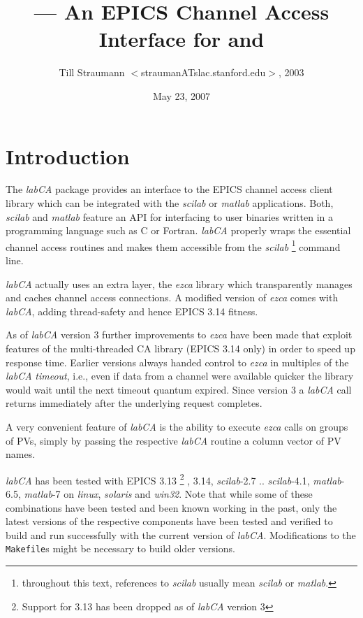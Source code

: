 \documentclass{article}
\title{\sca{} --- An EPICS Channel Access Interface for \scilab{} and \matlab{}}
\author{Till Straumann $<$straumanATslac.stanford.edu$>$, 2003}
\date{May 23, 2007}
\newcommand{\sca}{\ita{labCA}}
\newcommand{\scilab}{\ita{scilab}}
\newcommand{\matlab}{\ita{matlab}}
\newcommand{\windoze}{\ita{win32}}
\newcommand{\ezca}{\ita{ezca}}
\newcommand{\com}[1]{{\tt #1}}
\newcommand{\ita}[1]{\emph{#1}}
\begin{document}
\maketitle
{\hspace*{\fill}{\small\verb$Id: manual.tex,v 1.2 2007/11/16 16:45:00 ernesto Exp $}\hspace*{\fill}}
\section{Introduction}
The \sca{} package provides an interface to the
EPICS channel access client library which can be
integrated with the \scilab{} or \matlab{} applications.
Both, \scilab{} and \matlab{} feature an API for interfacing
to user binaries written in a programming language such
as C or Fortran. \sca{} properly wraps the essential
channel access routines and makes them accessible
from the \scilab%
\footnote{throughout this text, references to \scilab{}
usually mean \scilab{} or \matlab.}
command line.

\sca{} actually uses an extra layer, the \ezca{} library
which transparently manages and caches channel access 
connections. A modified version of \ezca{} comes with
\sca, adding thread-safety and hence EPICS 3.14 fitness.

As of \sca{} version 3 further improvements to \ezca{}
have been made that exploit features of the multi-threaded
CA library (EPICS 3.14 only) in order to speed up response time.
Earlier versions always handed control to \ezca{} in multiples of the
\sca{} \ita{timeout}, i.e., even if data from a channel
were available quicker the library would wait until the
next timeout quantum expired. Since version 3 a \sca{}
call returns immediately after the underlying request
completes.

A very convenient feature of \sca{} is the ability
to execute \ezca{} calls on groups of PVs, simply by
passing the respective \sca{} routine a column vector
of PV names.

\sca{} has been tested with EPICS 3.13%
\footnote{Support for 3.13 has been dropped as of \sca{} version 3}%
,
3.14, \scilab-2.7 .. \scilab-4.1,
\matlab-6.5, \matlab-7 on \ita{linux}, \ita{solaris} and
\windoze. Note that while some of these combinations have been
tested and been known working in the past, only the latest
versions of the respective components have been tested
and verified to build and run successfully with the
current version of \sca{}. Modifications to the \com{Makefile}s
might be necessary to build older versions.
\end{document}
